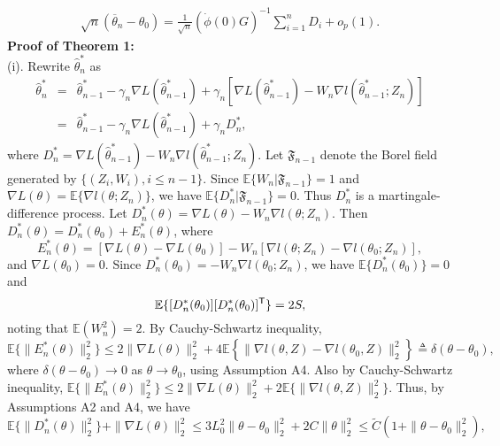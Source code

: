 \documentclass[12pt]{article}
\def\trans{^{\rm \textsf{T}}}
\def\wh{\widehat}
\def\ol{\overline}
\begin{document}
\begin{eqnarray}\label{sum-martingale-1}
\sqrt{n}(\ol{\theta}_n-\theta_0)=\frac{1}{\sqrt{n}}(\dot{\phi}(0)G)^{-1}\sum_{i=1}^n D_i+ o_p(1).
\end{eqnarray}
{\bf Proof of Theorem 1:}\\
(i). Rewrite $\wh{\theta}^*_n$ as
\begin{eqnarray}\label{SGD-wt-rewrite}
\wh{\theta}^*_n&=&\wh{\theta}^*_{n-1}-\gamma_n\nabla L(\wh{\theta}^*_{n-1})+\gamma_n\left[\nabla L(\wh{\theta}^*_{n-1})-W_n\nabla l(\wh{\theta}^*_{n-1}; Z_n)\right]\nonumber\\
&=& \wh{\theta}^*_{n-1}-\gamma_n\nabla L(\wh{\theta}^*_{n-1})+\gamma_n D^*_n,\label{SGD-wt-rewrite}
\end{eqnarray}
where $D^*_n=\nabla L(\wh{\theta}^*_{n-1})-W_n\nabla l(\wh{\theta}^*_{n-1}; Z_n)$.
 Let $\mathfrak{F}_{n-1}$ denote the Borel field generated by $\{(Z_i, W_i), i\leq n-1\}$.
Since $\mathbb{E}\{W_n|\mathfrak{F}_{n-1}\}=1$ and  $\nabla L(\theta)=\mathbb{E}\{\nabla l(\theta; Z_n)\}$, we have $\mathbb{E}\{D^*_n|\mathfrak{F}_{n-1}\}=0$. Thus $D^*_n$ is a martingale-difference process.
Let $D^*_n(\theta)=\nabla L(\theta)-W_n\nabla l(\theta; Z_n)$. Then $D^*_n(\theta)=D^*_n(\theta_0)+E^*_n(\theta)$, where
\begin{equation}
E^*_n(\theta)=[\nabla L(\theta)-\nabla L(\theta_0)]-W_n[\nabla l(\theta; Z_n)-\nabla l(\theta_0; Z_n)],
\end{equation}
and $\nabla L(\theta_0)=0$. Since $D^*_n(\theta_0)=-W_n\nabla l(\theta_0; Z_n)$, we have $\mathbb{E}\{D^*_n(\theta_0)\}=0$ and
\begin{equation}\label{D-0}
\mathbb{E}\{[D^*_n(\theta_0)][D^*_n(\theta_0)]\trans\}=2S,
\end{equation}\label{E-n}
noting that $\mathbb{E}(W_n^2)=2$. By Cauchy-Schwartz inequality,
\begin{equation}
\mathbb{E}\{\|E_n^*(\theta)\|_2^2\}\leq 2\|\nabla L(\theta)\|_2^2 + 4\mathbb{E}\left\{\|\nabla l(\theta, Z)-\nabla l(\theta_0, Z)\|^2_2\right\}\triangleq \delta(\theta-\theta_0),
\end{equation}
where $\delta(\theta-\theta_0) \rightarrow 0$ as $\theta\rightarrow\theta_0$, using Assumption A4. Also by Cauchy-Schwartz inequality, $\mathbb{E}\{\|E^*_n(\theta)\|_2^2\}\leq 2\|\nabla L(\theta)\|_2^2+2\mathbb{E}\{\|\nabla l(\theta, Z)\|_2^2\}$. Thus, by Assumptions A2 and A4, we have
\begin{equation}\label{D-n}
\mathbb{E}\{\|D_n^*(\theta)\|_2^2\}+\|\nabla L(\theta)\|_2^2\leq 3L_0^2\|\theta-\theta_0\|_2^2 + 2C\|\theta\|_2^2\leq \widetilde{C} (1+\|\theta-\theta_0\|_2^2),
\end{equation}
\end{document}
